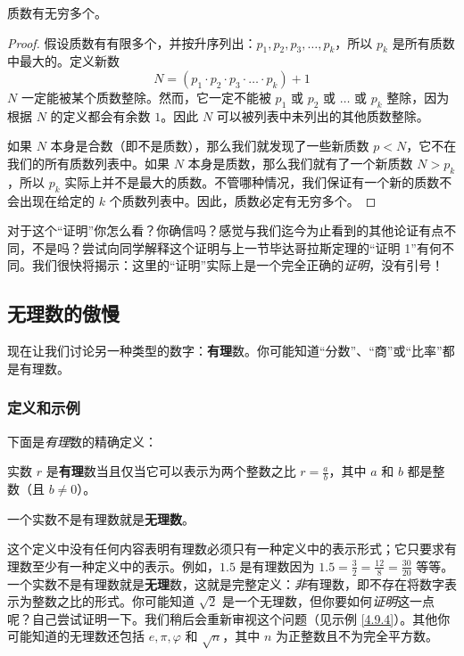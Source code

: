 \begin{theorem}[质数无限性]
    质数有无穷多个。
\end{theorem}

\begin{proof}
    假设质数有有限多个，并按升序列出：$p_1, p_2, p_3, \dots, p_k$，所以 $p_k$ 是所有质数中最大的。定义新数
    \[N = (p_1 \cdot p_2 \cdot p_3 \cdot \dots \cdot p_k) + 1\]
    $N$ 一定能被某个质数整除。然而，它一定不能被 $p_1$ 或 $p_2$ 或 $\dots$ 或 $p_k$ 整除，因为根据 $N$ 的定义都会有余数 $1$。因此 $N$ 可以被列表中未列出的其他质数整除。

    如果 $N$ 本身是合数（即不是质数），那么我们就发现了一些新质数 $p < N$，它不在我们的所有质数列表中。如果 $N$ 本身是质数，那么我们就有了一个新质数 $N > p_k$，所以 $p_k$ 实际上并不是最大的质数。不管哪种情况，我们保证有一个新的质数不会出现在给定的 $k$ 个质数列表中。因此，质数必定有无穷多个。
\end{proof}

对于这个“证明”你怎么看？你确信吗？感觉与我们迄今为止看到的其他论证有点不同，不是吗？尝试向同学解释这个证明与上一节毕达哥拉斯定理的“证明 1”有何不同。我们很快将揭示：这里的“证明”实际上是一个完全正确的\textit{证明}，没有引号！
    
\subsection{无理数的傲慢}

现在让我们讨论另一种类型的数字：\textbf{有理}数。你可能知道“分数”、“商”或“比率”都是有理数。

\subsubsection*{定义和示例}

下面是\textit{有理}数的精确定义：

\begin{definition}
    实数 $r$ 是\textbf{有理}数当且仅当它可以表示为两个整数之比 $r = \frac{a}{b}$，其中 $a$ 和 $b$ 都是整数（且 $b \ne 0$）。

    一个实数不是有理数就是\textbf{无理数}。
\end{definition}

这个定义中没有任何内容表明有理数必须只有一种定义中的表示形式；它只要求有理数至少有一种定义中的表示。例如，$1.5$ 是有理数因为 $1.5 = \frac{3}{2} = \frac{12}{8} = \frac{30}{20}$ 等等。一个实数不是有理数就是\textbf{无理}数，这就是完整定义：\textit{非}有理数，即不存在将数字表示为整数之比的形式。你可能知道 $\sqrt{2}$ 是一个无理数，但你要如何\textit{证明}这一点呢？自己尝试证明一下。我们稍后会重新审视这个问题（见示例 \ref{4.9.4}）。其他你可能知道的无理数还包括 $e, \pi, \varphi$ 和 $\sqrt{n}$，其中 $n$ 为正整数且不为完全平方数。

